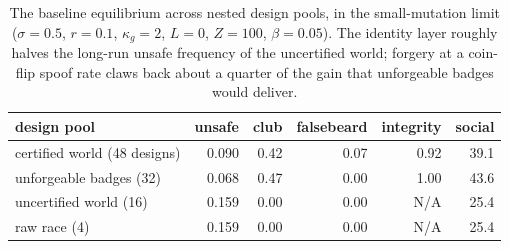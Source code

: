 \begin{table}[t]
\centering
\caption{The baseline equilibrium across nested design pools, in the
small-mutation limit ($\sigma = 0.5$, $r = 0.1$, $\kappa_g = 2$,
$L = 0$, $Z = 100$, $\beta = 0.05$).  The identity layer roughly
halves the long-run unsafe frequency of the uncertified world;
forgery at a coin-flip spoof rate claws back about a quarter of the
gain that unforgeable badges would deliver.}
\label{tab:pools}
\small
\begin{tabular}{lrrrrr}
\toprule
design pool & unsafe & club & falsebeard & integrity & social \\
\midrule
certified world (48 designs) & 0.090 & 0.42 & 0.07 & 0.92 & 39.1 \\
unforgeable badges (32) & 0.068 & 0.47 & 0.00 & 1.00 & 43.6 \\
uncertified world (16) & 0.159 & 0.00 & 0.00 & N/A & 25.4 \\
raw race (4) & 0.159 & 0.00 & 0.00 & N/A & 25.4 \\
\bottomrule
\end{tabular}
\end{table}
